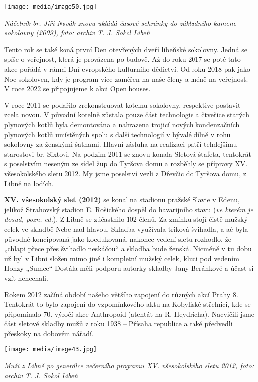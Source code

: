\texttt{[image: media/image50.jpg]}

\emph{Náčelník br. Jiří Novák znovu ukládá časové schránky do základního
kamene sokolovny (2009), foto: archiv T. J. Sokol Libeň}

Tento rok se také koná první Den otevřených dveří libeňské sokolovny.
Jedná se spíše o veřejnost, která je provázena po budově. Až do roku
2017 se poté tato akce pořádá v rámci Dní evropského kulturního
dědictví. Od roku 2018 pak jako Noc sokoloven, kdy je program více
zaměřen na naše členy a méně na veřejnost. V roce 2022 se připojujeme k
akci Open houses.

V roce 2011 se podařilo zrekonstruovat kotelnu sokolovny, respektive
postavit zcela novou. V původní kotelně zůstala pouze část technologie a
čtveřice starých plynových kotlů byla demontována a nahrazena trojicí
nových kondenzačních plynových kotlů umístěných spolu s další
technologií v bývalé dílně v rohu sokolovny za ženskými šatnami. Hlavní
zásluha na realizaci patří tehdejšímu starostovi br. Sixtovi. Na podzim
2011 se znovu konala Sletová štafeta, tentokrát s poselstvím neseným ze
sídel žup do Tyršova domu a rozběhly se přípravy XV. všesokolského sletu
2012. My jsme poselství vezli z Dřevčic do Tyršova domu, z Libně na
lodích.

\textbf{XV. všesokolský slet (2012)} se konal na stadionu pražské Slavie
v Edenu, jelikož Strahovský stadion E. Rošického dospěl do havarijního
stavu (\emph{ve kterém je dosud, pozn. ed.}). Z Libně se zúčastnilo 102
členů. Za zmínku stojí čistě mužský celek ve skladbě Nebe nad hlavou.
Skladba využívala triková švihadla, a ač byla původně koncipovaná jako
koedukovaná, nakonec vedení sletu rozhodlo, že „chlapi přece přes
švihadlo neskáčou`` a skladba bude ženská. Nicméně v tu dobu už byl v
Libni složen mimo jiné i kompletní mužský celek, kluci pod vedením Honzy
„Sumce`` Dostála měli podporu autorky skladby Jany Beránkové a účast si
vzít nenechali.

Rokem 2012 začíná období našeho většího zapojení do různých akcí Prahy
8. Tentokrát to bylo zapojení do vzpomínkového aktu na Kobyliské
střelnici, kde se připomínalo 70. výročí akce Anthropoid (atentát na R.
Heydricha). Nacvičili jsme část sletové skladby mužů z roku 1938 --
Přísaha republice a také předvedli přeskoky na dobovém nářadí.

\texttt{[image: media/image43.jpg]}

\emph{Muži z Libně po generálce večerního programu XV. všesokolského
sletu 2012, foto: archiv T. J. Sokol Libeň}

